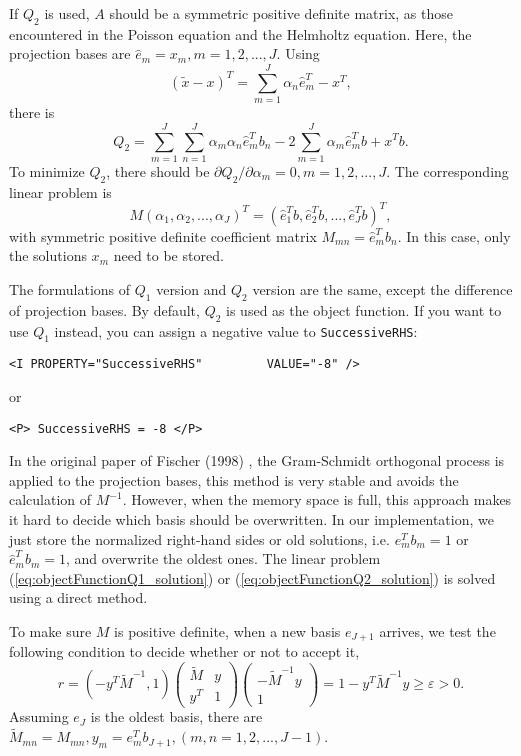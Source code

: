If $Q_2$ is used, $A$ should be a symmetric positive definite matrix, as those encountered in the Poisson equation and the Helmholtz equation. Here, the projection bases are $\hat{e}_m = x_m, m = 1, 2, ..., J$. Using
\begin{equation}\label{eq:tildex}
(\tilde{x}-x) ^T= \sum_{m=1}^J\alpha_n\hat{e}_m^T - x^T,
\end{equation}
there is
\begin{equation}\label{eq:objectFunctionQ2_v2}
Q_2= \sum_{m=1}^J\sum_{n=1}^J\alpha_m\alpha_n \hat{e}_m^T b_n - 2 \sum_{m=1}^J \alpha_m \hat{e}_m^T b + x^T b.
\end{equation}
To minimize $Q_2$, there should be $\partial Q_2/\partial \alpha_m =0, m=1, 2, ..., J$.
The corresponding linear problem is
\begin{equation}\label{eq:objectFunctionQ2_solution}
M (\alpha_1, \alpha_2, ..., \alpha_J)^T =   (\hat{e}_1^Tb, \hat{e}_2^Tb, ..., \hat{e}_J^Tb)^T,
\end{equation}
with symmetric positive definite coefficient matrix $M_{mn}=\hat{e}_m^T b_n$. In this case, only the solutions $x_m$ need to be stored.

The formulations of $Q_1$ version and $Q_2$ version are the same, except the difference of projection bases. By default, $Q_2$ is used as the object function. If you want to use $Q_1$ instead, you can assign a negative value to \texttt{SuccessiveRHS}:
\begin{lstlisting}[style=XMLStyle]
<I PROPERTY="SuccessiveRHS"         VALUE="-8" />
\end{lstlisting}
or
\begin{lstlisting}[style=XMLStyle]
<P> SuccessiveRHS = -8 </P>
\end{lstlisting}

In the original paper of Fischer (1998) \cite{FISCHER1998193}, the Gram-Schmidt orthogonal process is applied to the projection bases, this method is very stable and avoids the calculation of $M^{-1}$. However, when the memory space is full, this approach makes it hard to decide which basis should be overwritten. In our implementation, we just store the normalized right-hand sides or old solutions, i.e. $e_m^T b_m=1$ or $\hat{e}_m^T b_m=1$, and overwrite the oldest ones. The linear problem (\ref{eq:objectFunctionQ1_solution}) or (\ref{eq:objectFunctionQ2_solution}) is solved using a direct method.

To make sure $M$ is positive definite, when a new basis $e_{J+1}$ arrives, we test the following condition to decide whether or not to accept it,
\begin{equation}\label{eq:thredhold}
r = (-y^T\tilde{M} ^{-1}, 1) \begin{pmatrix}
\tilde{M}     & y\\
y^T  & 1
\end{pmatrix}
\begin{pmatrix}
-\tilde{M} ^{-1}y\\
1
\end{pmatrix} =1 - y^T\tilde{M}^{-1}y \ge \varepsilon > 0.
\end{equation}
Assuming $e_J$ is the oldest basis, there are $\tilde{M}_{mn} = M_{mn}, y_m = e_{m}^Tb_{J+1}, (m, n=1, 2, ..., J-1)$.

